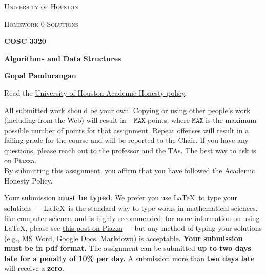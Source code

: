 \documentclass[final]{article}
\begin{document}
\begin{titlepage}
    \begin{center}
        {\scshape\LARGE University of Houston\par}
        \vspace{1cm}
        {\scshape\Large Homework 0 Solutions \par}
        \vspace{1.5cm}
        {\huge\bfseries COSC 3320 \par}
        {\huge\bfseries Algorithms and Data Structures \par}
        \vspace{0.5cm}
        {\large\bfseries Gopal Pandurangan\par}
    \end{center}


    Read the \href{https://www.uh.edu/provost/policies-resources/honesty/_documents-honesty/academic-honesty-policy.pdf}{University of Houston Academic Honesty policy}.

    \begin{tcolorbox}[title=Academic Honesty Policy,colback=red!15,colframe=red!65!black,fonttitle=\bfseries]All submitted work should be your own. Copying or using other people's work (including from the Web) will result in \(-\texttt{MAX}\) points, where \(\texttt{MAX}\) is the maximum possible number of points for that assignment. Repeat offenses will result in a failing grade for the course and will be reported to the Chair. If you have any questions, please reach out to the professor and the TAs. The best way to ask is on \href{https://piazza.com/uh/spring2021/cosc3320/home}{Piazza}.\\

        By submitting this assignment, you affirm that you have followed the Academic Honesty Policy.
    \end{tcolorbox}

    Your submission \textbf{must be typed}. We prefer you use \LaTeX~to type your solutions --- \LaTeX~is the standard way to type works in mathematical sciences, like computer science, and is highly recommended; for more information on using \LaTeX, please see \href{https://piazza.com/class/kjxhee6ctqe6cj?cid=8}{this post on Piazza} --- but any method of typing your solutions (e.g., MS Word, Google Docs, Markdown) is acceptable. \textbf{Your submission must be in pdf format.} The assignment can be submitted \textbf{up to two days late for a penalty of 10\% per day.} A submission more than \textbf{two days late} will receive a \textbf{zero}.


\end{titlepage}
\end{document}
